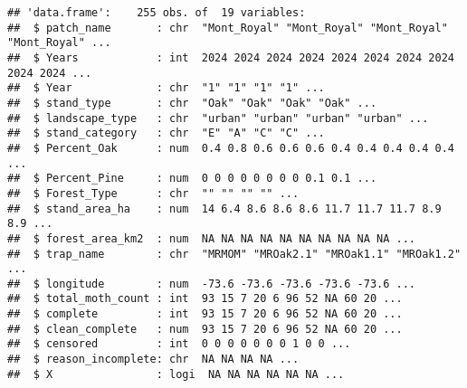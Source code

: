 \documentclass[
]{article}
\newenvironment{Shaded}{\begin{snugshade}}{\end{snugshade}}
\newcommand{\AttributeTok}[1]{\textcolor[rgb]{0.13,0.29,0.53}{#1}}
\newcommand{\CommentTok}[1]{\textcolor[rgb]{0.56,0.35,0.01}{\textit{#1}}}
\newcommand{\FunctionTok}[1]{\textcolor[rgb]{0.13,0.29,0.53}{\textbf{#1}}}
\newcommand{\NormalTok}[1]{#1}
\newcommand{\OtherTok}[1]{\textcolor[rgb]{0.56,0.35,0.01}{#1}}
\newcommand{\SpecialCharTok}[1]{\textcolor[rgb]{0.81,0.36,0.00}{\textbf{#1}}}
\newcommand{\StringTok}[1]{\textcolor[rgb]{0.31,0.60,0.02}{#1}}
\begin{document}
\begin{verbatim}
## 'data.frame':    255 obs. of  19 variables:
##  $ patch_name       : chr  "Mont_Royal" "Mont_Royal" "Mont_Royal" "Mont_Royal" ...
##  $ Years            : int  2024 2024 2024 2024 2024 2024 2024 2024 2024 2024 ...
##  $ Year             : chr  "1" "1" "1" "1" ...
##  $ stand_type       : chr  "Oak" "Oak" "Oak" "Oak" ...
##  $ landscape_type   : chr  "urban" "urban" "urban" "urban" ...
##  $ stand_category   : chr  "E" "A" "C" "C" ...
##  $ Percent_Oak      : num  0.4 0.8 0.6 0.6 0.6 0.4 0.4 0.4 0.4 0.4 ...
##  $ Percent_Pine     : num  0 0 0 0 0 0 0 0 0.1 0.1 ...
##  $ Forest_Type      : chr  "" "" "" "" ...
##  $ stand_area_ha    : num  14 6.4 8.6 8.6 8.6 11.7 11.7 11.7 8.9 8.9 ...
##  $ forest_area_km2  : num  NA NA NA NA NA NA NA NA NA NA ...
##  $ trap_name        : chr  "MRMOM" "MROak2.1" "MROak1.1" "MROak1.2" ...
##  $ longitude        : num  -73.6 -73.6 -73.6 -73.6 -73.6 ...
##  $ total_moth_count : int  93 15 7 20 6 96 52 NA 60 20 ...
##  $ complete         : int  93 15 7 20 6 96 52 NA 60 20 ...
##  $ clean_complete   : num  93 15 7 20 6 96 52 NA 60 20 ...
##  $ censored         : int  0 0 0 0 0 0 0 1 0 0 ...
##  $ reason_incomplete: chr  NA NA NA NA ...
##  $ X                : logi  NA NA NA NA NA NA ...
\end{verbatim}

\begin{Shaded}
\end{Shaded}
\end{document}
